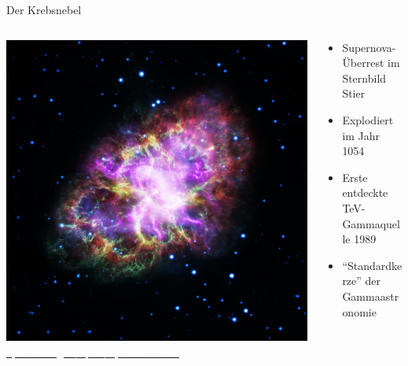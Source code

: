 \documentclass[aspectratio=1610, 9pt]{beamer}
\begin{document}
\begin{frame}[t]{Der Krebsnebel}
  \begin{columns}[onlytextwidth, c]
    \begin{column}{0.475\textwidth}%
      \includegraphics[width=\linewidth]{../thesis/images/crab.jpg}\\[-1.5\baselineskip]%
      \hspace{1ex}\href{https://apod.nasa.gov/apod/ap170511.html}{\textcolor{white}{apod.nasa.gov/apod/ap170511.html}}
    \end{column}%
    \hfill%
    \begin{column}{0.475\textwidth}
      \begin{itemize}
        \item Supernova-Überrest im Sternbild Stier
        \item Explodiert im Jahr 1054
        \item Erste entdeckte TeV-Gammaquelle 1989
        \item \enquote{Standardkerze} der Gammaastronomie
      \end{itemize}
    \end{column}%
  \end{columns}%
\end{frame}

\begin{frame}
  
\end{frame}
\end{document}

